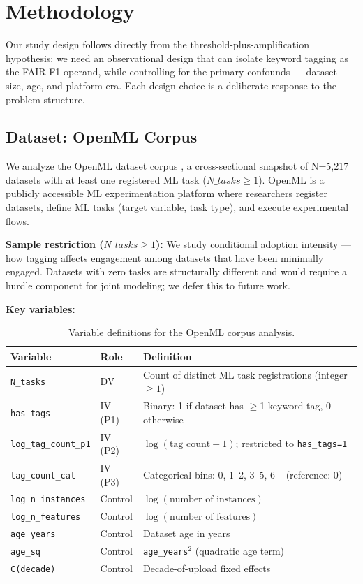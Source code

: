 \section{Methodology}
\label{sec:methodology}

Our study design follows directly from the threshold-plus-amplification hypothesis: we need an observational design that can isolate keyword tagging as the FAIR F1 operand, while controlling for the primary confounds --- dataset size, age, and platform era. Each design choice is a deliberate response to the problem structure.

\subsection{Dataset: OpenML Corpus}

We analyze the OpenML dataset corpus \citep{Vanschoren2014OpenML}, a cross-sectional snapshot of N=5,217 datasets with at least one registered ML task ($N\_tasks \geq 1$). OpenML is a publicly accessible ML experimentation platform where researchers register datasets, define ML tasks (target variable, task type), and execute experimental flows.

\textbf{Sample restriction ($N\_tasks \geq 1$):} We study conditional adoption intensity --- how tagging affects engagement among datasets that have been minimally engaged. Datasets with zero tasks are structurally different and would require a hurdle component for joint modeling; we defer this to future work.

\textbf{Key variables:}

\begin{table}[h]
\centering
\caption{Variable definitions for the OpenML corpus analysis.}
\label{tab:variables}
\begin{tabular}{lll}
\toprule
Variable & Role & Definition \\
\midrule
\texttt{N\_tasks} & DV & Count of distinct ML task registrations (integer $\geq 1$) \\
\texttt{has\_tags} & IV (P1) & Binary: 1 if dataset has $\geq$1 keyword tag, 0 otherwise \\
\texttt{log\_tag\_count\_p1} & IV (P2) & $\log(\text{tag\_count} + 1)$; restricted to \texttt{has\_tags=1} \\
\texttt{tag\_count\_cat} & IV (P3) & Categorical bins: 0, 1--2, 3--5, 6+ (reference: 0) \\
\texttt{log\_n\_instances} & Control & $\log(\text{number of instances})$ \\
\texttt{log\_n\_features} & Control & $\log(\text{number of features})$ \\
\texttt{age\_years} & Control & Dataset age in years \\
\texttt{age\_sq} & Control & \texttt{age\_years}$^2$ (quadratic age term) \\
\texttt{C(decade)} & Control & Decade-of-upload fixed effects \\
\bottomrule
\end{tabular}
\end{table}

